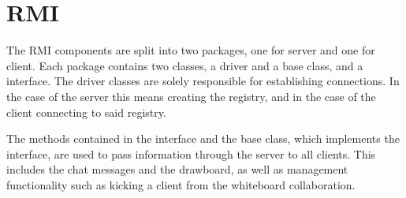 \section{RMI}
The RMI components are split into two packages, one for server and one for client.
Each package contains two classes, a driver and a base class, and a interface.
The driver classes are solely responsible for establishing connections.
In the case of the server this means creating the registry, and in the case of the client connecting to said registry.

The methods contained in the interface and the base class, which implements the interface, are used to pass information through the server to all clients.
This includes the chat messages and the drawboard, as well as management functionality such as kicking a client from the whiteboard collaboration.
